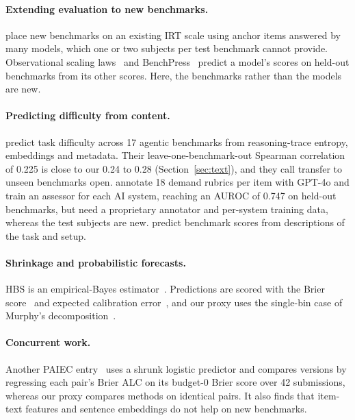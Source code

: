 \documentclass{article}
\begin{document}
\paragraph{Extending evaluation to new benchmarks.} \citet{habba2026growing} place new benchmarks on an existing IRT scale using anchor items answered by many models, which one or two subjects per test benchmark cannot provide. Observational scaling laws~\citep{ruan2024observational} and BenchPress~\citep{zeng2026benchpress} predict a model's scores on held-out benchmarks from its other scores. Here, the benchmarks rather than the models are new.

\paragraph{Predicting difficulty from content.} \citet{krsteski2026predicting} predict task difficulty across 17 agentic benchmarks from reasoning-trace entropy, embeddings and metadata. Their leave-one-benchmark-out Spearman correlation of 0.225 is close to our 0.24 to 0.28 (Section~\ref{sec:text}), and they call transfer to unseen benchmarks open. \citet{zhou2025general} annotate 18 demand rubrics per item with GPT-4o and train an assessor for each AI system, reaching an AUROC of 0.747 on held-out benchmarks, but need a proprietary annotator and per-system training data, whereas the test subjects are new. \citet{park2025anticipatory} predict benchmark scores from descriptions of the task and setup.

\paragraph{Shrinkage and probabilistic forecasts.} HBS is an empirical-Bayes estimator~\citep{efron1975data}. Predictions are scored with the Brier score~\citep{brier1950verification} and expected calibration error~\citep{guo2017calibration}, and our proxy uses the single-bin case of Murphy's decomposition~\citep{murphy1973new}.

\paragraph{Concurrent work.} Another PAIEC entry~\citep{aghasalim2026shrunk} uses a shrunk logistic predictor and compares versions by regressing each pair's Brier ALC on its budget-0 Brier score over 42 submissions, whereas our proxy compares methods on identical pairs. It also finds that item-text features and sentence embeddings do not help on new benchmarks.
\end{document}
